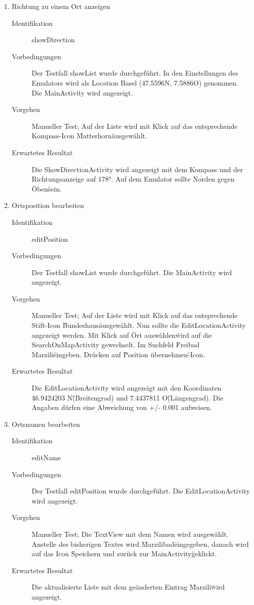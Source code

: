 \documentclass[12pt,a4paper]{scrartcl}
\begin{document}
\begin{enumerate}
  \item Richtung zu einem Ort anzeigen

  \begin{description}
    \item [Identifikation] showDirection
    \item [Vorbedingungen] Der Testfall showList wurde durchgeführt. In den Einstellungen des Emulators wird als Location Basel (47.5596N, 7.5886O) genommen. Die MainActivity wird angezeigt.
    \item [Vorgehen] Manueller Test; Auf der Liste wird mit Klick auf das entsprechende Kompass-Icon \"Matterhorn\" ausgewählt.
    \item [Erwartetes Resultat] Die ShowDirectionActivity wird angezeigt mit dem Kompass und der Richtungsanzeige auf 178°. Auf dem Emulator sollte Norden gegen \"Oben\" sein.
  \end{description}

  \item Ortsposition bearbeiten

  \begin{description}
    \item [Identifikation] editPosition
    \item [Vorbedingungen] Der Testfall showList wurde durchgeführt. Die MainActivity wird angezeigt.
    \item [Vorgehen] Manueller Test; Auf der Liste wird mit Klick auf das entsprechende Stift-Icon \"Bundeshaus\" ausgewählt. Nun sollte die EditLocationActivity angezeigt werden. Mit Klick auf \"Ort auswählen\" wird auf die SearchOnMapActivity gewechselt. Im Suchfeld \"Freibad Marzili\" eingeben. Drücken auf \"Position übernehmen\"-Icon.
    \item [Erwartetes Resultat] Die EditLocationActivity wird angezeigt mit den Koordinaten \"46.9424203 N\" (Breitengrad) und \"7.4437811 O\" (Längengrad). Die Angaben dürfen eine Abweichung von +/- 0.001 aufweisen.
  \end{description}

  \item Ortsnamen bearbeiten

  \begin{description}
  \item [Identifikation] editName
  \item [Vorbedingungen] Der Testfall editPosition wurde durchgeführt. Die EditLocationActivity wird angezeigt.
  \item [Vorgehen] Manueller Test; Die TextView mit dem Namen wird ausgewählt. Anstelle des bisherigen Textes wird \"Marzilibad\" eingegeben, danach wird auf das Icon \"Speichern und zurück zur MainActivity\" geklickt.
  \item [Erwartetes Resultat] Die aktualisierte Liste mit dem geänderten Eintrag \"Marzili\" wird angezeigt.
  \end{description}

\end{enumerate}
\end{document}
